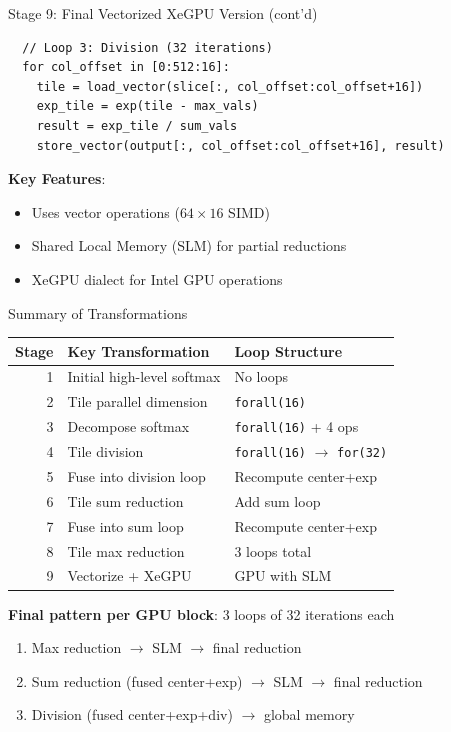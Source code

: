 \documentclass[aspectratio=169]{beamer}
\begin{document}
\begin{frame}[fragile]{Stage 9: Final Vectorized XeGPU Version (cont'd)}
\begin{lstlisting}
  // Loop 3: Division (32 iterations)
  for col_offset in [0:512:16]:
    tile = load_vector(slice[:, col_offset:col_offset+16])
    exp_tile = exp(tile - max_vals)
    result = exp_tile / sum_vals
    store_vector(output[:, col_offset:col_offset+16], result)
\end{lstlisting}

\vspace{0.3cm}

\textbf{Key Features}:
\begin{itemize}
\item Uses vector operations ($64 \times 16$ SIMD)
\item Shared Local Memory (SLM) for partial reductions
\item XeGPU dialect for Intel GPU operations
\end{itemize}
\end{frame}

\begin{frame}{Summary of Transformations}
\begin{table}
\centering
\small
\begin{tabular}{@{}rll@{}}
\toprule
\textbf{Stage} & \textbf{Key Transformation} & \textbf{Loop Structure} \\
\midrule
1 & Initial high-level softmax & No loops \\
2 & Tile parallel dimension & \texttt{forall(16)} \\
3 & Decompose softmax & \texttt{forall(16)} + 4 ops \\
4 & Tile division & \texttt{forall(16)} $\rightarrow$ \texttt{for(32)} \\
5 & Fuse into division loop & Recompute center+exp \\
6 & Tile sum reduction & Add sum loop \\
7 & Fuse into sum loop & Recompute center+exp \\
8 & Tile max reduction & 3 loops total \\
9 & Vectorize + XeGPU & GPU with SLM \\
\bottomrule
\end{tabular}
\end{table}

\vspace{0.3cm}

\textbf{Final pattern per GPU block}: 3 loops of 32 iterations each
\begin{enumerate}
\item Max reduction $\rightarrow$ SLM $\rightarrow$ final reduction
\item Sum reduction (fused center+exp) $\rightarrow$ SLM $\rightarrow$ final reduction
\item Division (fused center+exp+div) $\rightarrow$ global memory
\end{enumerate}
\end{frame}
\end{document}

